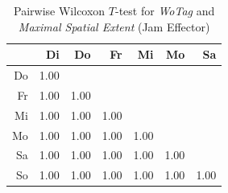 
        









    \begin{table}[ht!]
        \tiny
        \centering
        \begin{tabular}{rrrrrrr}
            \toprule
                & Di & Do & Fr & Mi & Mo & Sa \\ 
            \midrule
            Do & 1.00 &  &  &  &  &  \\ 
            Fr & 1.00 & 1.00 &  &  &  &  \\ 
            Mi & 1.00 & 1.00 & 1.00 &  &  &  \\ 
            Mo & 1.00 & 1.00 & 1.00 & 1.00 &  &  \\ 
            Sa & 1.00 & 1.00 & 1.00 & 1.00 & 1.00 &  \\ 
            So & 1.00 & 1.00 & 1.00 & 1.00 & 1.00 & 1.00 \\ 
            \bottomrule
            \end{tabular}
        \caption{Pairwise Wilcoxon $T$-test for \textit{WoTag} and \textit{Maximal Spatial Extent} (Jam Effector)}
        \label{tbl:wilcoxon_baysis_effector_WoTag_SMax}
    \end{table}

